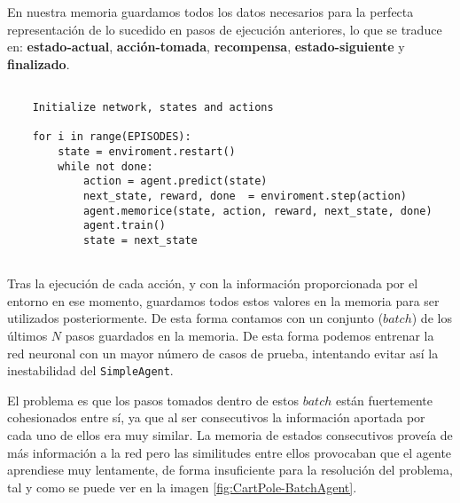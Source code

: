 En nuestra memoria guardamos todos los datos necesarios para la perfecta representación de lo sucedido en pasos de ejecución anteriores, lo que se traduce en: \textbf{estado-actual}, \textbf{acción-tomada}, \textbf{recompensa}, \textbf{estado-siguiente} y \textbf{finalizado}.

    


\begin{minipage}{0.9\linewidth}%
    \begin{lstlisting}[frame=tb, caption=Pseudocódigo BatchAgent, inputencoding=latin1, label=code:cartpole_drl2]
    
    Initialize network, states and actions
    
    for i in range(EPISODES):
        state = enviroment.restart()
        while not done:
            action = agent.predict(state)
            next_state, reward, done  = enviroment.step(action)
            agent.memorice(state, action, reward, next_state, done)
            agent.train()
            state = next_state
        
    \end{lstlisting}%
\end{minipage}

Tras la ejecución de cada acción, y con la información proporcionada por el entorno en ese momento, guardamos todos estos valores en la memoria para ser utilizados posteriormente. De esta forma contamos con un conjunto ($batch$) de los últimos $N$ pasos guardados en la memoria. De esta forma podemos entrenar la red neuronal con un mayor número de casos de prueba, intentando evitar así la inestabilidad del \texttt{SimpleAgent}.

El problema es que los pasos tomados dentro de estos $batch$ están fuertemente cohesionados entre sí, ya que al ser consecutivos la información aportada por cada uno de ellos era muy similar. La memoria de estados consecutivos proveía de más información a la red pero las similitudes entre ellos provocaban que el agente aprendiese muy lentamente, de forma insuficiente para la resolución del problema, tal y como se puede ver en la imagen \ref{fig:CartPole-BatchAgent}.

